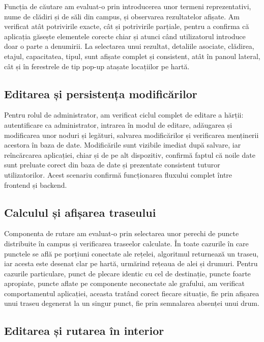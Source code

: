 Funcția de căutare am evaluat-o prin introducerea unor termeni
reprezentativi, nume de clădiri și de săli din campus, și observarea
rezultatelor afișate. Am verificat atât potrivirile exacte, cât și
potrivirile parțiale, pentru a confirma că aplicația găsește elementele corecte
chiar și atunci când utilizatorul introduce doar o parte a denumirii. La
selectarea unui rezultat, detaliile asociate, clădirea, etajul, capacitatea,
tipul, sunt afișate complet și consistent, atât în panoul lateral, cât și în
ferestrele de tip pop-up atașate locațiilor pe hartă.



\subsection{Editarea și persistența modificărilor}
\label{subsec:test-editare}

Pentru rolul de administrator, am verificat ciclul complet de editare a
hărții: autentificare ca administrator, intrarea în modul de editare, adăugarea
și modificarea unor noduri și legături, salvarea modificărilor și verificarea
menținerii acestora în baza de date. Modificările sunt vizibile imediat după salvare, iar
reîncărcarea aplicației, chiar și de pe alt dispozitiv, confirmă faptul că noile date
sunt preluate corect din baza de date și prezentate consistent tuturor
utilizatorilor. Acest scenariu confirmă funcționarea fluxului complet între
frontend și backend.



\subsection{Calculul și afișarea traseului}
\label{subsec:test-traseu}

Componenta de rutare am evaluat-o prin selectarea unor perechi de puncte
distribuite în campus și verificarea traseelor calculate. În toate cazurile în
care punctele se află pe porțiuni conectate ale rețelei, algoritmul returnează un
traseu, iar acesta este desenat clar pe hartă, urmărind rețeaua de alei și
drumuri. Pentru cazurile particulare, punct de plecare identic cu cel de
destinație, puncte foarte apropiate, puncte aflate pe componente neconectate ale
grafului, am verificat comportamentul aplicației, aceasta tratând corect
fiecare situație, fie prin afișarea unui traseu degenerat la un singur punct, fie
prin semnalarea absenței unui drum.

\subsection{Editarea și rutarea în interior}
\label{subsec:test-indoor}

